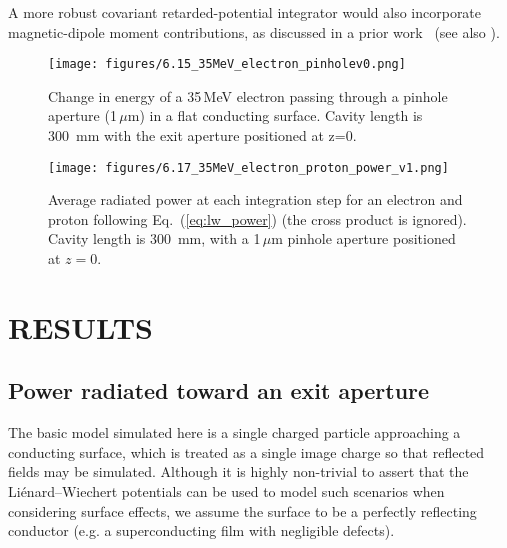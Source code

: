 \documentclass[reprint,
               amsmath,amssymb,nofootinbib, aps%
              ]{revtex4-2}
\begin{document}
A more robust covariant retarded-potential integrator would also incorporate magnetic-dipole moment contributions, as discussed in a prior work~\cite{folsom:ipac2021-tupab218} (see also \cite{steinmetzMagneticDipoleMoment2019a}). 

\begin{figure}[ht!]
    \centering
    \texttt{[image: figures/6.15\_35MeV\_electron\_pinholev0.png]}
    \caption{Change in energy of a 35\,MeV electron passing through a pinhole aperture (1\,$\mu$m) in a flat conducting surface. Cavity length is 300~mm with the exit aperture positioned at z=0.}
\label{fig:e_dep_35_MeV_elec}
\end{figure}

\begin{figure}[ht!]
    \centering
    \texttt{[image: figures/6.17\_35MeV\_electron\_proton\_power\_v1.png]}
    \caption{Average radiated power at each integration step for an electron and proton following Eq.~(\ref{eq:lw_power}) (the cross product is ignored). Cavity length is 300~mm, with a 1\,$\mu$m pinhole aperture positioned at $z=0$.}
\label{fig:pow_dep_elec_prot}
\end{figure}

\vspace{-0.2cm}
\section{RESULTS} \label{results}
\vspace{-0.2cm}
\subsection{Power radiated toward an exit aperture}
The basic model simulated here is a single charged particle approaching a conducting surface, which is treated as a single image charge so that reflected fields may be simulated. Although it is highly non-trivial to assert that the Liénard--Wiechert potentials can be used to model such scenarios when considering surface effects, we assume the surface to be a perfectly reflecting conductor (e.g. a superconducting film with negligible defects).
\end{document}
